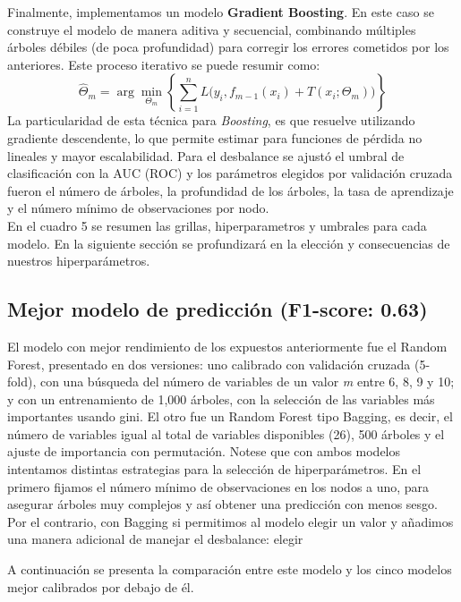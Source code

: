 \documentclass[12pt,a4paper,onecolumn]{article}
\begin{document}
Finalmente, implementamos un modelo \textbf{Gradient Boosting}. En este caso se construye el modelo de manera aditiva y secuencial, combinando múltiples árboles débiles (de poca profundidad) para corregir los errores cometidos por los anteriores. Este proceso iterativo se puede resumir como:
\[
\hat{\Theta}_m = \arg\min_{\Theta_m} 
\left\{
\sum_{i=1}^{n} 
L\big( y_i, f_{m-1}(x_i) + T(x_i; \Theta_m) \big)
\right\}
\]
La particularidad de esta técnica para \textit{Boosting}, es que resuelve utilizando gradiente descendente, lo que permite estimar para funciones de pérdida no lineales y mayor escalabilidad. Para el desbalance se ajustó el umbral de clasificación con la AUC (ROC) y los parámetros elegidos por validación cruzada fueron el número de árboles, la profundidad de los árboles, la tasa de aprendizaje y el número mínimo de observaciones por nodo.\\

En el cuadro 5 se resumen las grillas, hiperparametros y umbrales para cada modelo. En la siguiente sección se profundizará en la elección y consecuencias de nuestros hiperparámetros.\\

\subsection{Mejor modelo de predicción (F1-score: 0.63)}

El modelo con mejor rendimiento de los expuestos anteriormente fue el Random Forest, presentado en dos versiones: uno calibrado con validación cruzada (5-fold), con una búsqueda del número de variables de un valor \textit{m} entre 6, 8, 9 y 10; y con un entrenamiento de 1,000 árboles, con la selección de las variables más importantes usando gini. El otro fue un Random Forest tipo Bagging, es decir, el número de variables igual al total de variables disponibles (26), 500 árboles y el ajuste de importancia con permutación. Notese que con ambos modelos intentamos distintas estrategias para la selección de hiperparámetros. En el primero fijamos el número mínimo de observaciones en los nodos a uno, para asegurar árboles muy complejos y así obtener una predicción con menos sesgo. Por el contrario, con Bagging si permitimos al modelo elegir un valor y añadimos una manera adicional de manejar el desbalance: elegir 

A continuación se presenta la comparación entre este modelo y los cinco modelos mejor calibrados por debajo de él.\\
\end{document}
